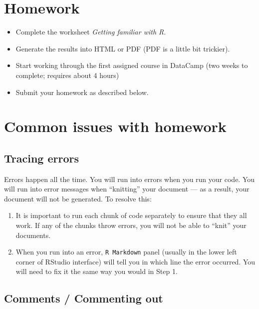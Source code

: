 \documentclass[
]{book}
\providecommand{\tightlist}{%
  \setlength{\itemsep}{0pt}\setlength{\parskip}{0pt}}
\begin{document}
\hypertarget{L01_HW}{%
\section{Homework}\label{L01_HW}}

\begin{itemize}
\tightlist
\item
  Complete the worksheet \emph{Getting familiar with R}.
\item
  Generate the results into HTML or PDF (PDF is a little bit trickier).
\item
  Start working through the first assigned course in DataCamp (two weeks to complete; requires about 4 hours)
\item
  Submit your homework as described below.
\end{itemize}

\hypertarget{L01_commonissues}{%
\section{Common issues with homework}\label{L01_commonissues}}

\hypertarget{tracing-errors}{%
\subsection{Tracing errors}\label{tracing-errors}}

Errors happen all the time. You will run into errors when you run your code. You will run into error messages when ``knitting'' your document --- as a result, your document will not be generated. To resolve this:

\begin{enumerate}
\def\labelenumi{\arabic{enumi}.}
\tightlist
\item
  It is important to run each chunk of code separately to ensure that they all work. If any of the chunks throw errors, you will not be able to ``knit'' your documents.
\item
  When you run into an error, \texttt{R\ Markdown} panel (usually in the lower left corner of RStudio interface) will tell you in which line the error occurred. You will need to fix it the same way you would in Step 1.
\end{enumerate}

\hypertarget{comments-commenting-out}{%
\subsection{Comments / Commenting out}\label{comments-commenting-out}}
\end{document}
